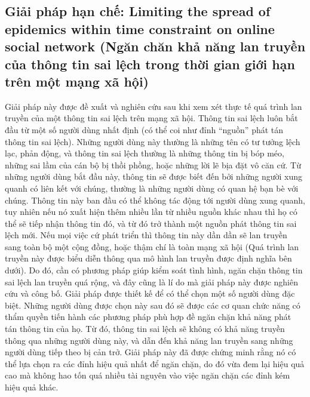  	\subsection{Giải pháp hạn chế: Limiting the spread of epidemics within time constraint on online social network (Ngăn chăn khả năng lan truyền của thông tin sai lệch trong thời gian giới hạn trên một mạng xã hội)}
 	Giải pháp này được đề xuất và nghiên cứu sau khi xem xét thực tế quá trình lan truyền của một thông tin sai lệch trên mạng xã hội. Thông tin sai lệch luôn bắt đầu từ một số người dùng nhất định (có thể coi như đỉnh “nguồn” phát tán thông tin sai lệch). Những người dùng này thường là những tên có tư tưởng lệch lạc, phản động, và thông tin sai lệch thường là những thông tin bị bóp méo, những sai lầm của cán bộ bị thồi phồng, hoặc những lời lẽ bịa đặt vô căn cứ. Từ những người dùng bắt đầu này, thông tin sẽ được biết đến bởi những người xung quanh có liên kết với chúng, thường là những người dùng có quan hệ bạn bè với chúng. Thông tin này ban đầu có thể không tác động tới người dùng xung quanh, tuy nhiên nếu nó xuất hiện thêm nhiều lần từ nhiều nguồn khác nhau thì họ có thể sẽ tiếp nhận thông tin đó, và từ đó trở thành một nguồn phát thông tin sai lệch mới. Nếu mọi việc cứ phát triển thì thông tin này dần dần sẽ lan truyền sang toàn bộ một cộng đồng, hoặc thậm chí là toàn mạng xã hội (Quá trình lan truyền này được biểu diễn thông qua mô hình lan truyền được định nghĩa bên dưới). Do đó, cần có phương pháp giúp kiểm soát tình hình, ngăn chặn thông tin sai lệch lan truyền quá rộng, và đây cũng là lí do mà giải pháp này được nghiên cứu và công bố. Giải pháp được thiết kế để có thể chọn một số người dùng đặc biệt. Những người dùng được chọn này sau đó sẽ được các cơ quan chức năng có thẩm quyền tiến hành các phương pháp phù hợp đề ngăn chặn khả năng phát tán thông tin của họ. Từ đó, thông tin sai lệch sẽ không có khả năng truyền thông qua những người dùng này, và dẫn đến khả năng lan truyền sang những người dùng tiếp theo bị cản trở. Giải pháp này đã được chứng minh rằng nó có thể lựa chọn ra các đỉnh hiệu quả nhất để ngăn chặn, do đó vừa đem lại hiệu quả cao mà không hao tốn quá nhiều tài nguyên vào việc ngăn chặn các đỉnh kém hiệu quả khác.
